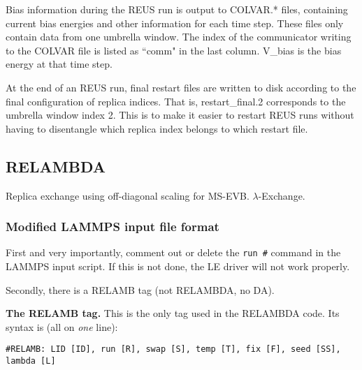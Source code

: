 \documentclass[10pt]{article}
\begin{document}
Bias information during the REUS run is output to COLVAR.* files, containing current bias energies and other information for each
time step. These files only contain data from one umbrella window. The index of the communicator writing to the COLVAR file is
listed as ``comm" in the last column. V\_bias is the bias energy at that time step.

At the end of an REUS run, final restart files are written to disk according to the final configuration of replica indices.
That is, restart\_final.2 corresponds to the umbrella window index 2. This is to make it easier to restart REUS runs without
having to disentangle which replica index belongs to which restart file.


\subsection{RELAMBDA}

Replica exchange using off-diagonal scaling for MS-EVB. $\lambda$-Exchange.

\subsubsection{Modified LAMMPS input file format}

First and very importantly, comment out
or delete the \texttt{run \#} command in the LAMMPS input script. If this is not done,
the LE driver will not work properly. 

Secondly, there is a RELAMB tag (not RELAMBDA, no DA).

\textbf{The RELAMB tag.} This is the only tag used in the RELAMBDA code. Its syntax is (all on {\em one} line):
\begin{verbatim}
#RELAMB: LID [ID], run [R], swap [S], temp [T], fix [F], seed [SS], lambda [L]
\end{verbatim}
\end{document}
